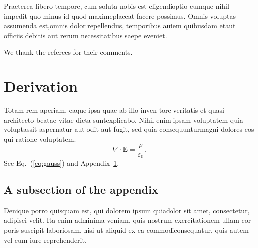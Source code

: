 \documentclass[reprint,aps,pra,superscriptaddress,10pt,nofootinbib,nobalancelastpage]{revtex4-2}
\begin{document}
Praeterea libero tempore, cum soluta nobis est eligendi\linebreak optio cumque nihil impedit quo minus id quod maxime\linebreak placeat facere possimus. Omnis voluptas assumenda est,\linebreak omnis dolor repellendus, temporibus autem quibusdam et\linebreak aut officiis debitis aut rerum necessitatibus saepe eveniet.

\begin{acknowledgments}
We thank the referees for their comments.
\end{acknowledgments}

\appendix
\section{Derivation}\label{app:derivation}
Totam rem aperiam, eaque ipsa quae ab illo inven-\linebreak tore veritatis et quasi architecto beatae vitae dicta sunt\linebreak explicabo. Nihil enim ipsam voluptatem quia voluptas\linebreak sit aspernatur aut odit aut fugit, sed quia consequuntur\linebreak magni dolores eos qui ratione voluptatem.
\begin{equation}
\nabla \cdot \mathbf{E} = \frac{\rho}{\varepsilon_0} .
\label{eq:gauss}
\end{equation}
See Eq.~(\ref{eq:gauss}) and Appendix~\ref{app:derivation}.

\subsection{A subsection of the appendix}
Denique porro quisquam est, qui dolorem ipsum quia\linebreak dolor sit amet, consectetur, adipisci velit. Ita enim ad\linebreak minima veniam, quis nostrum exercitationem ullam cor-\linebreak poris suscipit laboriosam, nisi ut aliquid ex ea commodi\linebreak consequatur, quis autem vel eum iure reprehenderit.
\end{document}
